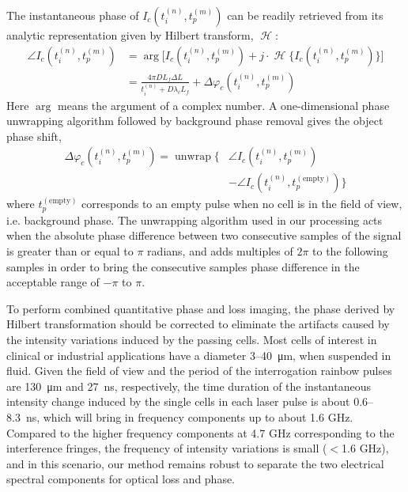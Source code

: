 \documentclass[aps,pra,reprint,superscriptaddress]{revtex4-1}
\DeclareMathOperator{\hilbert}{\mathcal{H}} %
\DeclareMathOperator{\unwrap}{unwrap} %
\begin{document}
The instantaneous phase of $I_c(t_i^{(n)}, t_p^{(m)})$ can be readily retrieved from its analytic representation given by Hilbert transform, $\hilbert$:
\begin{equation} \label{eqn:angle}
\begin{split}
\angle I_c(t_i^{(n)}, t_p^{(m)}) &= \arg\Big[I_c(t_i^{(n)}, t_p^{(m)}) + j \cdot \hilbert \lbrace I_c(t_i^{(n)}, t_p^{(m)}) \rbrace\Big] \\
&=  \frac{4\pi D L_f\Delta L}{t_i^{(n)} + D\lambda_c L_f} + \Delta \varphi_c(t_i^{(n)}, t_p^{(m)})
\end{split}
\end{equation}
Here $\arg$ means the argument of a complex number. A one-dimensional phase unwrapping algorithm followed by background phase removal gives the object phase shift, 
\begin{equation}
\begin{split}
\Delta\varphi_c(t_i^{(n)}, t_p^{(m)}) = \unwrap \lbrace &\angle I_c(t_i^{(n)}, t_p^{(m)}) \\
&- \angle I_c(t_i^{(n)}, t_p^{(\text{empty})}) \rbrace
\end{split}
\end{equation}
where $t_p^{(\text{empty})}$ corresponds to an empty pulse when no cell is in the field of view, i.e. background phase. The unwrapping algorithm used in our processing acts when the absolute phase difference between two consecutive samples of the signal is greater than or equal to $\pi$ radians, and adds multiples of $2\pi$ to the following samples in order to bring the consecutive samples phase difference in the acceptable range of $-\pi$ to $\pi$. 

To perform combined quantitative phase and loss imaging, the phase derived by Hilbert transformation should be corrected to eliminate the artifacts caused by the intensity variations induced by the passing cells. Most cells of interest in clinical or industrial applications have a diameter 3--\SI{40}{\micro\meter}, when suspended in fluid. Given the field of view and the period of the interrogation rainbow pulses are \SI{130}{\micro\meter} and \SI{27}{\nano\second}, respectively, the time duration of the instantaneous intensity change induced by the single cells in each laser pulse is about 0.6--\SI{8.3}{\nano\second}, which will bring in frequency components up to about 1.6 GHz. Compared to the higher frequency components at 4.7 GHz corresponding to the interference fringes, the frequency of intensity variations is small ($<$1.6 GHz), and in this scenario, our method remains robust to separate the two electrical spectral components for optical loss and phase.
\end{document}

